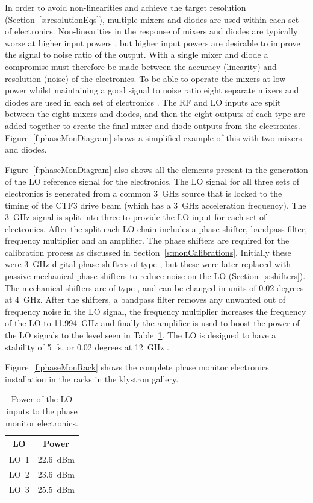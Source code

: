 In order to avoid non-linearities and achieve the target resolution (Section~\ref{s:resolutionEqs}), multiple mixers and diodes are used within each set of electronics. Non-linearities in the response of mixers and diodes are typically worse at higher input powers \cite{alex09}, but higher input powers are desirable to improve the signal to noise ratio of the output. With a single mixer and diode a compromise must therefore be made between the accuracy (linearity) and resolution (noise) of the electronics. To be able to operate the mixers at low power whilst maintaining a good signal to noise ratio eight separate mixers and diodes are used in each set of electronics \cite{alex09}. The RF and LO inputs are split between the eight mixers and diodes, and then the eight outputs of each type are added together to create the final mixer and diode outputs from the electronics. Figure~\ref{f:phaseMonDiagram} shows a simplified example of this with two mixers and diodes.

Figure~\ref{f:phaseMonDiagram} also shows all the elements present in the generation of the LO reference signal for the electronics. The LO signal for all three sets of electronics is generated from a common 3~GHz source that is locked to the timing of the CTF3 drive beam (which has a 3~GHz acceleration frequency). The 3~GHz signal is split into three to provide the LO input for each set of electronics. After the split each LO chain includes a phase shifter, bandpass filter, frequency multiplier and an amplifier. The phase shifters are required for the calibration process as discussed in Section~\ref{s:monCalibrations}. Initially these were 3~GHz digital phase shifters of type \cite{reyShifters}, but these were later replaced with passive mechanical phase shifters to reduce noise on the LO (Section~\ref{s:shifters}). The mechanical shifters are of type \cite{mechPhShift}, and can be changed in units of 0.02 degrees at 4~GHz. After the shifters, a bandpass filter \cite{klFilter} removes any unwanted out of frequency noise in the LO signal, the frequency multiplier \cite{freqMulti} increases the frequency of the LO to 11.994~GHz and finally the amplifier \cite{amp12GHz} is used to boost the power of the LO signals to the level seen in Table~\ref{t:loPowers}. The LO is designed to have a stability of 5~fs, or 0.02 degrees at 12~GHz \cite{alex09}.

Figure~\ref{f:phaseMonRack} shows the complete phase monitor electronics installation in the racks in the klystron gallery.

\begin{table}
  \begin{center}
    \begin{tabular}{|c c|}
	   \hline
       LO & Power \\ \hline
       LO~1 & 22.6~dBm \\
       LO~2 & 23.6~dBm \\
       LO~3 & 25.5~dBm \\ \hline
    \end{tabular}
    \caption{Power of the LO inputs to the phase monitor electronics.}
  	\label{t:loPowers}
  \end{center}
\end{table}

